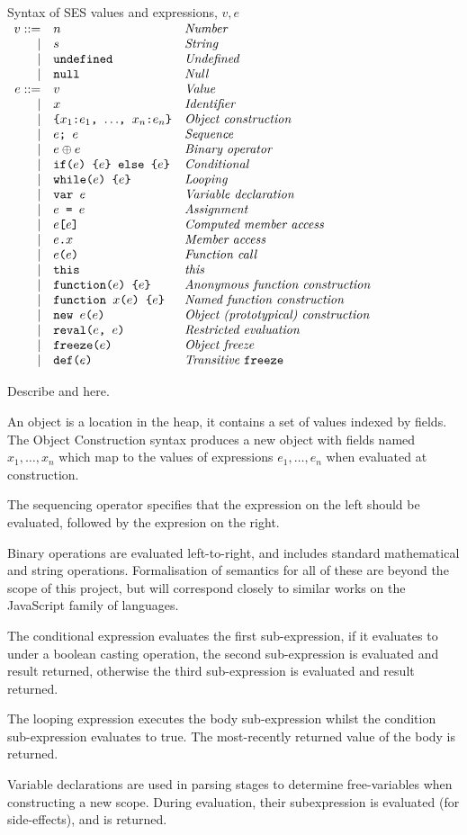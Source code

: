 \documentclass[a4paper]{article}
\begin{document}
\newcommand{\syntaxline}[3][\pipe]{#1 & \js{#2} & \textit{#3}\\}
\begin{display}{Syntax of SES values and expressions, $v, e$}
  $\begin{array}{rll}
    \syntaxline[v ::=]{$n$}{Number}
    \syntaxline{$s$}{String}
    \syntaxline{undefined}{Undefined}
    \syntaxline{null}{Null}
    \syntaxline[e ::=]{$v$}{Value}
    \syntaxline{$x$}{Identifier}
    \syntaxline{\{$x_1$:$e_1$, $\ldots$, $x_n$:$e_n$\}}{Object construction}
    \syntaxline{$e$; $e$}{Sequence}
    \syntaxline{$e \oplus e$}{Binary operator}
    \syntaxline{if($e$) \{$e$\} else \{$e$\}}{Conditional}
    \syntaxline{while($e$) \{$e$\}}{Looping}
    \syntaxline{var $e$}{Variable declaration}
    \syntaxline{$e$ = $e$}{Assignment}
    \syntaxline{$e$[$e$]}{Computed member access}
    \syntaxline{$e$.$x$}{Member access}
    \syntaxline{$e$($e$)}{Function call}
    \syntaxline{this}{this}
    \syntaxline{function($e$) \{$e$\}}{Anonymous function construction}
    \syntaxline{function $x$($e$) \{$e$\}}{Named function construction}
    \syntaxline{new $e$($e$)}{Object (prototypical) construction}
    \syntaxline{reval($e$, $e$)}{Restricted evaluation}
    \syntaxline{freeze($e$)}{Object freeze}
    \syntaxline{def($e$)}{Transitive \js{freeze}}
  \end{array}$
\end{display}

Describe  and  here.

An object is a location in the heap, it contains a set of values indexed by
fields. The Object Construction syntax produces a new object with fields named
$x_1, \ldots, x_n$ which map to the values of expressions $e_1, \ldots, e_n$
when evaluated at construction.

The sequencing operator specifies that the expression on the left should be
evaluated, followed by the expresion on the right.

Binary operations are evaluated left-to-right, and includes standard
mathematical and string operations. Formalisation of semantics for all of these
are beyond the scope of this project, but will correspond closely to similar
works on the JavaScript family of languages.

The conditional expression evaluates the first sub-expression, if it evaluates
to  under a boolean casting operation, the second sub-expression is
evaluated and result returned, otherwise the third sub-expression is evaluated
and result returned.

The looping expression executes the body sub-expression whilst the condition
sub-expression evaluates to true. The most-recently returned value of the body
is returned.

Variable declarations are used in parsing stages to determine free-variables
when constructing a new scope. During evaluation, their subexpression is
evaluated (for side-effects), and  is returned.
\end{document}
